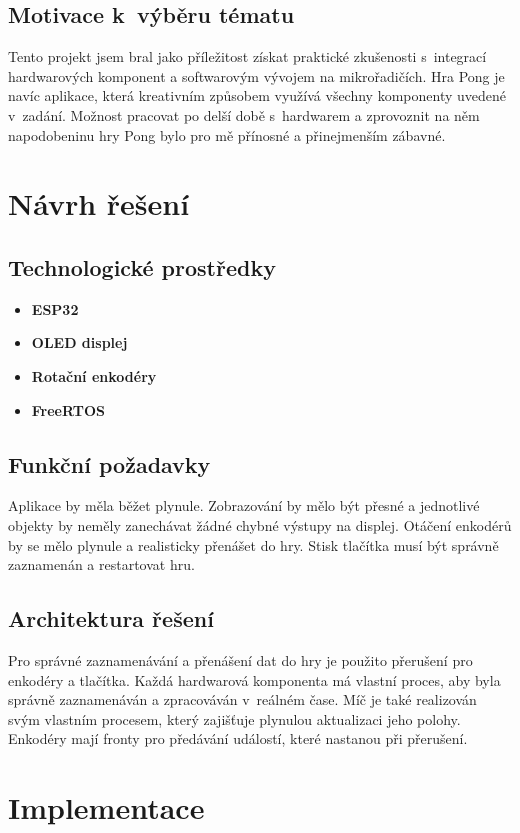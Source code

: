 \documentclass[a4paper,11pt]{article}
\begin{document}
\subsection{Motivace k~výběru tématu}
Tento projekt jsem bral jako příležitost získat praktické zkušenosti s~integrací hardwarových komponent a softwarovým vývojem na mikrořadičích. 
Hra Pong je navíc aplikace, která kreativním způsobem využívá všechny komponenty uvedené v~zadání. 
Možnost pracovat po delší době s~hardwarem a zprovoznit na něm napodobeninu hry Pong bylo pro mě přínosné a přinejmenším zábavné. 

\section{Návrh řešení}
\subsection{Technologické prostředky}
\begin{itemize}
    \item \textbf{ESP32}
    \item \textbf{OLED displej}
    \item \textbf{Rotační enkodéry}
    \item \textbf{FreeRTOS}
\end{itemize}

\subsection{Funkční požadavky}
Aplikace by měla běžet plynule. 
Zobrazování by mělo být přesné a jednotlivé objekty by neměly zanechávat žádné chybné výstupy na displej.
Otáčení enkodérů by se mělo plynule a realisticky přenášet do hry.
Stisk tlačítka musí být správně zaznamenán a restartovat hru.

\subsection{Architektura řešení}
Pro správné zaznamenávání a přenášení dat do hry je použito přerušení pro enkodéry a tlačítka.
Každá hardwarová komponenta má vlastní proces, aby byla správně zaznamenáván a zpracováván v~reálném čase.
Míč je také realizován svým vlastním procesem, který zajišťuje plynulou aktualizaci jeho polohy.
Enkodéry mají fronty pro předávání událostí, které nastanou při přerušení.

\section{Implementace}
\end{document}
